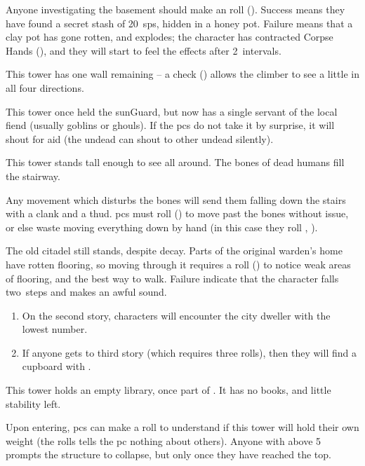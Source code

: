 \begin{multicols}{2}
\begin{dlist}
  Anyone investigating the basement should make an  roll (\tn[10]).
  Success means they have found a secret stash of 20~\glspl{sp}, hidden in a honey pot.
  Failure means that a clay pot has gone rotten, and explodes; the character has contracted Corpse Hands (), and they will start to feel the effects after 2~\glspl{interval}.
  \item
  This tower has one wall remaining -- a  check (\tn[8]) allows the climber to see a little in all four directions.
  \item
  This tower once held the \gls{sunGuard}, but now has a single servant of the local fiend (usually goblins or ghouls).
  If the \glspl{pc} do not take it by surprise, it will shout for aid (the undead can shout to other undead silently).
  \item
  This tower stands tall enough to see all around.
  The bones of dead humans fill the stairway.

  Any movement which disturbs the bones will send them falling down the stairs with a clank and a thud.
  \Glspl{pc} must roll  (\tn[11]) to move past the bones without issue, or else waste  moving everything down by hand (in this case they roll , \tn[7]).
  \item
  The old citadel still stands, despite decay.
  Parts of the original \gls{warden}'s home have rotten flooring, so moving through it requires a  roll (\tn[8]) to notice weak areas of flooring, and the best way to walk.
  Failure indicate that the character falls two~\glspl{step}%
  and makes an awful sound.
  \begin{enumerate}
    \item
    On the second story, characters will encounter the city dweller with the lowest number.
    \item
    If anyone gets to third story (which requires three rolls), then they will find a cupboard with \lootBig.
  \end{enumerate}
  \item
  This tower holds an empty library, once part of .
  It has no books, and little stability left.

  Upon entering, \glspl{pc} can make a  roll to understand if this tower will hold their own weight (the rolls tells the \gls{pc} nothing about others).
  Anyone with  above 5 prompts the structure to collapse, but only once they have reached the top.


\end{dlist}
\end{multicols}
